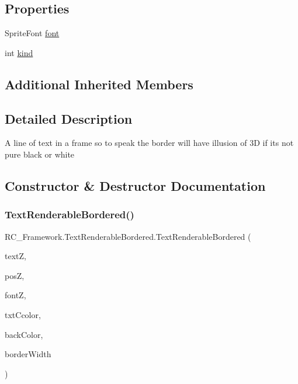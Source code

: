 \subsection*{Properties}
\begin{DoxyCompactItemize}
\item 
Sprite\+Font \mbox{\hyperlink{class_r_c___framework_1_1_text_renderable_bordered_ab84bad631bade836f6b1f020ddff13ae}{font}}
\item 
int \mbox{\hyperlink{class_r_c___framework_1_1_text_renderable_bordered_a366e1b80f3ab924956144c79ec4d4374}{kind}}
\end{DoxyCompactItemize}
\subsection*{Additional Inherited Members}


\subsection{Detailed Description}
A line of text in a frame so to speak the border will have illusion of 3D if its not pure black or white 



\subsection{Constructor \& Destructor Documentation}
\mbox{\label{class_r_c___framework_1_1_text_renderable_bordered_a14199b2a8d6f25b9e77ceaf11cb17477}} 
\subsubsection{\texorpdfstring{Text\+Renderable\+Bordered()}{TextRenderableBordered()}}
{\footnotesize\ttfamily R\+C\+\_\+\+Framework.\+Text\+Renderable\+Bordered.\+Text\+Renderable\+Bordered (\begin{DoxyParamCaption}\item[{string}]{textZ,  }\item[{Rectangle}]{posZ,  }\item[{Sprite\+Font}]{fontZ,  }\item[{Color}]{txt\+Ccolor,  }\item[{Color}]{back\+Color,  }\item[{int}]{border\+Width }\end{DoxyParamCaption})}



